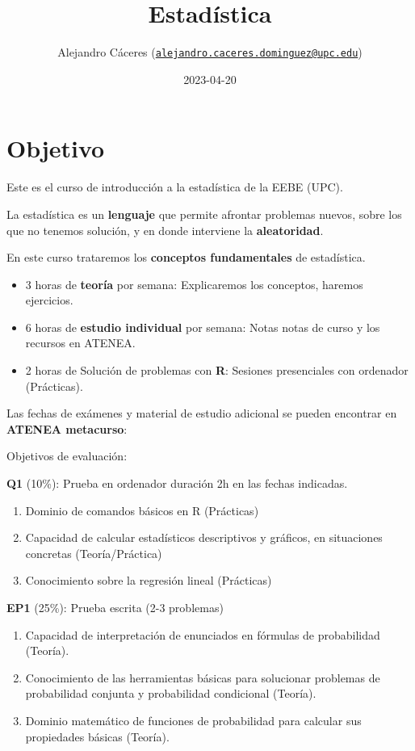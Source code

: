 \documentclass[
]{book}
\title{Estadística}
\author{Alejandro Cáceres (\href{mailto:alejandro.caceres.dominguez@upc.edu}{\nolinkurl{alejandro.caceres.dominguez@upc.edu}})}
\date{2023-04-20}
\providecommand{\tightlist}{%
  \setlength{\itemsep}{0pt}\setlength{\parskip}{0pt}}
\begin{document}
\maketitle

{
\setcounter{tocdepth}{1}
\tableofcontents
}
\hypertarget{objetivo}{%
\chapter{Objetivo}\label{objetivo}}

Este es el curso de introducción a la estadística de la EEBE (UPC).

La estadística es un \textbf{lenguaje} que permite afrontar problemas nuevos, sobre los que no tenemos solución, y en donde interviene la \textbf{aleatoridad}.

En este curso trataremos los \textbf{conceptos fundamentales} de estadística.

\begin{itemize}
\item
  3 horas de \textbf{teoría} por semana: Explicaremos los conceptos, haremos ejercicios.
\item
  6 horas de \textbf{estudio individual} por semana: Notas notas de curso y los recursos en ATENEA.
\item
  2 horas de Solución de problemas con \textbf{R}: Sesiones presenciales con ordenador (Prácticas).
\end{itemize}

Las fechas de exámenes y material de estudio adicional se pueden encontrar en \textbf{ATENEA metacurso}:

Objetivos de evaluación:

\textbf{Q1} (10\%): Prueba en ordenador duración 2h en las fechas indicadas.

\begin{enumerate}
\def\labelenumi{\alph{enumi}.}
\tightlist
\item
  Dominio de comandos básicos en R (Prácticas)
\item
  Capacidad de calcular estadísticos descriptivos y gráficos, en situaciones concretas (Teoría/Práctica)
\item
  Conocimiento sobre la regresión lineal (Prácticas)
\end{enumerate}

\textbf{EP1} (25\%): Prueba escrita (2-3 problemas)

\begin{enumerate}
\def\labelenumi{\alph{enumi}.}
\tightlist
\item
  Capacidad de interpretación de enunciados en fórmulas de probabilidad (Teoría).
\item
  Conocimiento de las herramientas básicas para solucionar problemas de probabilidad conjunta y probabilidad condicional (Teoría).
\item
  Dominio matemático de funciones de probabilidad para calcular sus propiedades básicas (Teoría).
\end{enumerate}
\end{document}
